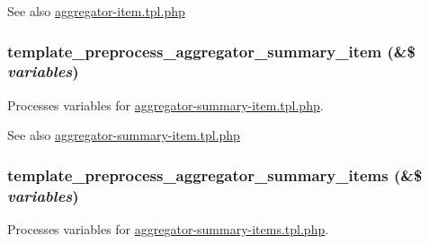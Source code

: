 \begin{DoxySeeAlso}{See also}
\hyperlink{aggregator-item_8tpl_8php}{aggregator-\/item.tpl.php} 
\end{DoxySeeAlso}
\hypertarget{aggregator_8pages_8inc_ab60386a469193731ad719534bcdcac56}{
\subsubsection[{template\_\-preprocess\_\-aggregator\_\-summary\_\-item}]{\setlength{\rightskip}{0pt plus 5cm}template\_\-preprocess\_\-aggregator\_\-summary\_\-item (\&\$ {\em variables})}}
\label{aggregator_8pages_8inc_ab60386a469193731ad719534bcdcac56}
Processes variables for \hyperlink{aggregator-summary-item_8tpl_8php}{aggregator-\/summary-\/item.tpl.php}.

\begin{DoxySeeAlso}{See also}
\hyperlink{aggregator-summary-item_8tpl_8php}{aggregator-\/summary-\/item.tpl.php} 
\end{DoxySeeAlso}
\hypertarget{aggregator_8pages_8inc_af80643fa6f8b742a431aed61576606dd}{
\subsubsection[{template\_\-preprocess\_\-aggregator\_\-summary\_\-items}]{\setlength{\rightskip}{0pt plus 5cm}template\_\-preprocess\_\-aggregator\_\-summary\_\-items (\&\$ {\em variables})}}
\label{aggregator_8pages_8inc_af80643fa6f8b742a431aed61576606dd}
Processes variables for \hyperlink{aggregator-summary-items_8tpl_8php}{aggregator-\/summary-\/items.tpl.php}.

